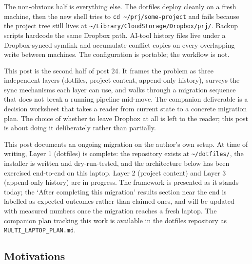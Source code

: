 \documentclass[
  11pt,
  letterpaper,
  DIV=11,
  numbers=noendperiod]{scrartcl}
\begin{document}
The non-obvious half is everything else. The dotfiles deploy cleanly on
a fresh machine, then the new shell tries to
\texttt{cd\ \textasciitilde{}/prj/some-project} and fails because the
project tree still lives at
\texttt{\textasciitilde{}/Library/CloudStorage/Dropbox/prj/}. Backup
scripts hardcode the same Dropbox path. AI-tool history files live under
a Dropbox-synced symlink and accumulate conflict copies on every
overlapping write between machines. The configuration is portable; the
workflow is not.

This post is the second half of post 24. It frames the problem as three
independent layers (dotfiles, project content, append-only history),
surveys the sync mechanisms each layer can use, and walks through a
migration sequence that does not break a running pipeline mid-move. The
companion deliverable is a decision worksheet that takes a reader from
current state to a concrete migration plan. The choice of whether to
leave Dropbox at all is left to the reader; this post is about doing it
deliberately rather than partially.

\begin{tcolorbox}[enhanced jigsaw, rightrule=.15mm, titlerule=0mm, left=2mm, colback=white, title=\textcolor{quarto-callout-note-color}{\faInfo}\hspace{0.5em}{Status of this migration}, colframe=quarto-callout-note-color-frame, opacityback=0, colbacktitle=quarto-callout-note-color!10!white, toprule=.15mm, breakable, leftrule=.75mm, bottomtitle=1mm, arc=.35mm, toptitle=1mm, bottomrule=.15mm, opacitybacktitle=0.6, coltitle=black]

This post documents an ongoing migration on the author's own setup. At
time of writing, Layer 1 (dotfiles) is complete: the repository exists
at \texttt{\textasciitilde{}/dotfiles/}, the installer is written and
dry-run-tested, and the architecture below has been exercised end-to-end
on this laptop. Layer 2 (project content) and Layer 3 (append-only
history) are in progress. The framework is presented as it stands today;
the `After completing this migration' results section near the end is
labelled as expected outcomes rather than claimed ones, and will be
updated with measured numbers once the migration reaches a fresh laptop.
The companion plan tracking this work is available in the dotfiles
repository as \texttt{MULTI\_LAPTOP\_PLAN.md}.

\end{tcolorbox}

\subsection{Motivations}\label{motivations}
\end{document}
